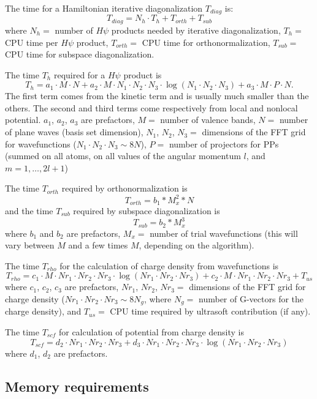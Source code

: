 \documentclass[12pt,a4paper]{article}
\begin{document}
The time for a Hamiltonian iterative diagonalization $T_{diag}$ is:
$$
T_{diag} = N_h \cdot T_h + T_{orth} + T_{sub}
$$
where $N_h=$ number of $H\psi$ products needed by iterative
diagonalization, $T_h=$ CPU time per $H\psi$ product, $T_{orth}=$ CPU
time for orthonormalization, $T_{sub}=$ CPU time for subspace
diagonalization.

The time $T_h$ required for a $H\psi$ product is
$$
T_h = a_1 \cdot M \cdot N
      + a_2 \cdot M \cdot N_1 \cdot N_2 \cdot N_3 \cdot
        \log(N_1 \cdot N_2 \cdot N_3)
      + a_3 \cdot M \cdot P \cdot N.
$$
The first term comes from the kinetic term and is usually much smaller
than the others.
The second and third terms come respectively from local and nonlocal
potential.
$a_1$, $a_2$, $a_3$ are prefactors, $M=$ number of valence bands,
$N=$ number of plane waves (basis set dimension), 
$N_1$, $N_2$, $N_3=$ dimensions of the FFT grid for wavefunctions
($N_1 \cdot N_2 \cdot N_3 \sim 8N$), $P=$ number of projectors for PPs
(summed on all atoms, on all values of the angular momentum $l$, and
$m=1,\dots,2l+1$)

The time $T_{orth}$ required by orthonormalization is
$$
      T_{orth}=b_1*M_x^2*N
$$
and the time $T_{sub}$ required by subspace diagonalization is
$$
   T_{sub}=b_2*M_x^3
$$
where $b_1$ and $b_2$ are prefactors, $M_x=$ number of trial
wavefunctions (this will vary between $M$ and a few times $M$,
depending on the algorithm).

The time $T_{rho}$ for the calculation of charge density from
wavefunctions is
$$
T_{rho} = c_1 \cdot M \cdot Nr_1 \cdot Nr_2 \cdot Nr_3 \cdot
          \log(Nr_1 \cdot Nr_2 \cdot Nr_3)
          + c_2 \cdot M \cdot Nr_1 \cdot Nr_2 \cdot Nr_3 + T_{us}
$$
where $c_1$, $c_2$, $c_3$ are prefactors,
$Nr_1$, $Nr_2$, $Nr_3=$ dimensions of the FFT grid for charge density
($Nr_1 \cdot Nr_2 \cdot Nr_3 \sim 8N_g$, where $N_g=$ number of
G-vectors for the charge density), and $T_{us}=$ CPU time required by
ultrasoft contribution (if any).

The time $T_{scf}$ for calculation of potential from charge density is
$$
T_{scf} = d_2 \cdot Nr_1 \cdot Nr_2 \cdot Nr_3 + d_3 \cdot
          Nr_1 \cdot Nr_2 \cdot Nr_3 \cdot
          \log(Nr_1 \cdot Nr_2 \cdot Nr_3) 
$$
where $d_1$, $d_2$ are prefactors.

\subsection{Memory requirements}
\end{document}
